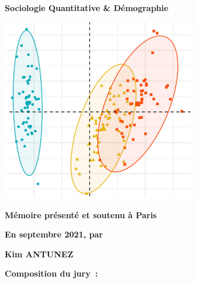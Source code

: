 \documentclass[12pt,a4paper]{reedthesis}
\begin{document}
\begin{titlepage}
\color{black}
\large
\textbf{Sociologie Quantitative \& Démographie}
\normalsize


\vspace{10mm}
\begin{center}
\includegraphics[height=8cm]{logos/accueil.png}
\end{center}
\vspace{10mm}

\textbf{Mémoire présenté et soutenu à Paris}

\textbf{En septembre 2021, par}

\Large {\color{Prune} \textbf{Kim ANTUNEZ}}

\vspace{15mm}

\flushleft \normalsize \textbf{Composition du jury~:}
\bigskip


\end{titlepage}
\end{document}
